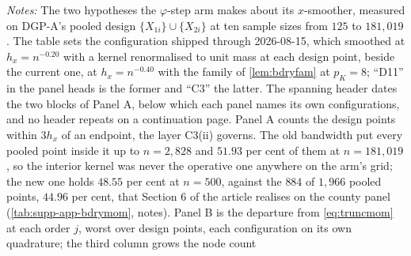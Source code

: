 \documentclass[
  12pt]{article}
\newcommand{\1}[1]{\mathds{1}\left[#1\right]}
\theoremstyle{plain}
\theoremstyle{definition}
\theoremstyle{definition}
\theoremstyle{remark}
\begin{document}
%
\begin{landscape}
\begingroup
\singlespacing
\scriptsize
\setlength{\tabcolsep}{2pt}
\label{tab:supp-bdrylayer}
\let\tabular\longtable
\let\endtabular\endlongtable

\addtocounter{table}{-1}
\endgroup
\begingroup\singlespacing\scriptsize
\textit{Notes:} The two hypotheses the $\varphi$-step arm makes about its
$x$-smoother, measured on DGP-A's pooled design $\{X_{1i}\}\cup\{X_{2i}\}$ at
ten sample sizes from $125$ to $181{,}019$. The table sets the configuration
shipped through 2026-08-15, which smoothed at $h_x=n^{-0.20}$ with a kernel
renormalised to unit mass at each design point, beside the current one, at
$h_x=n^{-0.40}$ with the family of \cref{lem:bdryfam} at $p_K=8$; ``D11'' in the
panel heads is the former and ``C3'' the latter. The spanning header dates the
two blocks of Panel A, below which each panel names its own configurations, and
no header repeats on a continuation page. Panel A counts the design points
within $3h_x$ of an endpoint, the layer C3(ii) governs. The old bandwidth put
every pooled point inside it up to $n=2{,}828$ and $51.93$ per cent of them at
$n=181{,}019$, so the interior kernel was never the operative one anywhere on
the arm's grid; the new one holds $48.55$ per cent at $n=500$, against the $884$
of $1{,}966$ pooled points, $44.96$ per cent, that Section 6 of the article
realises on the county panel (\cref{tab:supp-app-bdrymom}, notes). Panel B is the
departure from \eqref{eq:truncmom} at each order $j$, worst over design points,
each configuration on its own quadrature; the third column grows the node count

\end{landscape}
\end{document}
